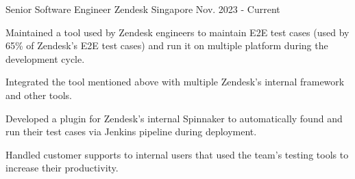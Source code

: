 

\begin{cventries}

  \cventry
    {Senior Software Engineer} %
    {Zendesk} %
    {Singapore} %
    {Nov. 2023 - Current} %
    {
      \begin{cvitems} %
        \item {Maintained a tool used by Zendesk engineers to maintain E2E test cases (used by 65\% of Zendesk's E2E test cases) and run it on multiple platform during the development cycle.}
        \item {Integrated the tool mentioned above with multiple Zendesk's internal framework and other tools.}
        \item {Developed a plugin for Zendesk's internal Spinnaker to automatically found and run their test cases via Jenkins pipeline during deployment.}
        \item {Handled customer supports to internal users that used the team's testing tools to increase their productivity.}
      \end{cvitems}
    }


\end{cventries}
